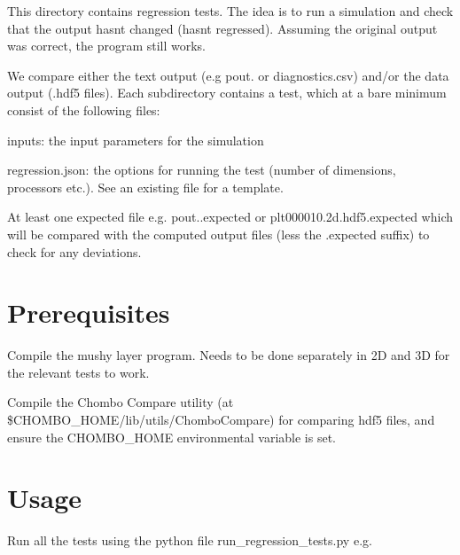 This directory contains regression tests. The idea is to run a simulation and check that the output hasn\textquotesingle{}t changed (hasn\textquotesingle{}t \textquotesingle{}regressed\textquotesingle{}). Assuming the original output was correct, the program still works.

We compare either the text output (e.\+g {\ttfamily pout.} or {\ttfamily diagnostics.\+csv}) and/or the data output ({\ttfamily .hdf5} files). Each subdirectory contains a test, which at a bare minimum consist of the following files\+:


\begin{DoxyEnumerate}
\item {\ttfamily inputs}\+: the input parameters for the simulation
\item {\ttfamily regression.\+json}\+: the options for running the test (number of dimensions, processors etc.). See an existing file for a template.
\item At least one \textquotesingle{}expected\textquotesingle{} file e.\+g. {\ttfamily pout..\+expected} or {\ttfamily plt000010.\+2d.\+hdf5.\+expected} which will be compared with the computed output files (less the {\ttfamily .expected} suffix) to check for any deviations.
\end{DoxyEnumerate}

\section*{Prerequisites}


\begin{DoxyEnumerate}
\item Compile the mushy layer program. Needs to be done separately in 2D and 3D for the relevant tests to work.
\item Compile the Chombo Compare utility (at {\ttfamily \$\+C\+H\+O\+M\+B\+O\+\_\+\+H\+O\+ME/lib/utils/\+Chombo\+Compare}) for comparing hdf5 files, and ensure the {\ttfamily C\+H\+O\+M\+B\+O\+\_\+\+H\+O\+ME} environmental variable is set.
\end{DoxyEnumerate}

\section*{Usage}

Run all the tests using the python file {\ttfamily run\+\_\+regression\+\_\+tests.\+py} e.\+g.




